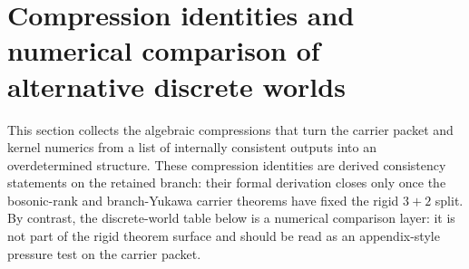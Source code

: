 \section{Compression identities and numerical comparison of alternative discrete worlds}

This section collects the algebraic compressions that turn the carrier packet and kernel numerics
from a list of internally consistent outputs into an overdetermined structure. These compression
identities are derived consistency statements on the retained branch: their formal derivation closes
only once the bosonic-rank and branch-Yukawa carrier theorems have fixed the rigid $3+2$ split. By
contrast, the discrete-world table below is a numerical comparison layer: it is not part of the
rigid theorem surface and should be read as an appendix-style pressure test on the carrier packet.

